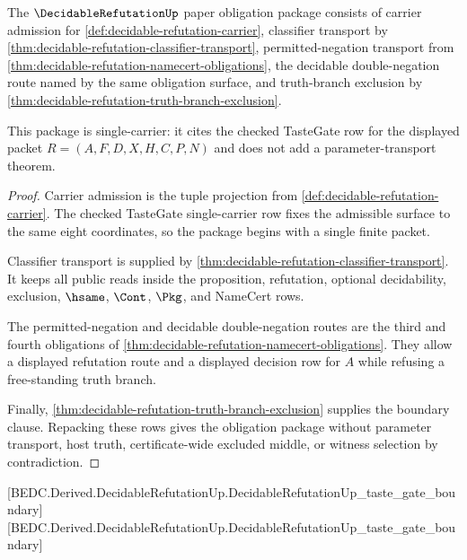 \begin{theorem}
\label{thm:decidable-refutation-obligation-package}
The $\DecidableRefutationUp$ paper obligation package consists of carrier admission for \autoref{def:decidable-refutation-carrier}, classifier transport by \autoref{thm:decidable-refutation-classifier-transport}, permitted-negation transport from \autoref{thm:decidable-refutation-namecert-obligations}, the decidable double-negation route named by the same obligation surface, and truth-branch exclusion by \autoref{thm:decidable-refutation-truth-branch-exclusion}.

This package is single-carrier: it cites the checked TasteGate row for the displayed packet $R=(A,F,D,X,H,C,P,N)$ and does not add a parameter-transport theorem.
\end{theorem}
\begin{proof}
Carrier admission is the tuple projection from \autoref{def:decidable-refutation-carrier}. The checked TasteGate single-carrier row fixes the admissible surface to the same eight coordinates, so the package begins with a single finite packet.

Classifier transport is supplied by \autoref{thm:decidable-refutation-classifier-transport}. It keeps all public reads inside the proposition, refutation, optional decidability, exclusion, $\hsame$, $\Cont$, $\Pkg$, and NameCert rows.

The permitted-negation and decidable double-negation routes are the third and fourth obligations of \autoref{thm:decidable-refutation-namecert-obligations}. They allow a displayed refutation route and a displayed decision row for $A$ while refusing a free-standing truth branch.

Finally, \autoref{thm:decidable-refutation-truth-branch-exclusion} supplies the boundary clause. Repacking these rows gives the obligation package without parameter transport, host truth, certificate-wide excluded middle, or witness selection by contradiction.
\end{proof}

[BEDC.Derived.DecidableRefutationUp.DecidableRefutationUp\_taste\_gate\_boundary]
[BEDC.Derived.DecidableRefutationUp.DecidableRefutationUp\_taste\_gate\_boundary]

